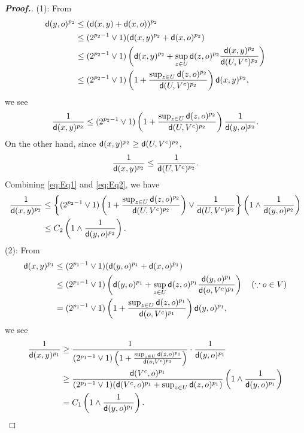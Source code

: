 \documentclass[12pt,a4paper]{article}
\newcommand{\1}{{\bf 1}}
\begin{document}
\begin{proof}[{\bf Proof.}]
(1): From
\begin{align*}
{\sf d}(y,o)^{p_2}&\leq({\sf d}(x,y)+{\sf d}(x,o))^{p_2}\\
&\leq(2^{p_2-1}\lor1)({\sf d}(x,y)^{p_2}+{\sf d}(x,o)^{p_2})\\
&\leq (2^{p_2-1}\lor1)\left({\sf d}(x,y)^{p_2}+\sup_{z\in U}{\sf d}(z,o)^{p_2}\frac{{\sf d}(x,y)^{p_2}}{{\sf d}(U,V^c)^{p_2}} \right)\\
&\leq (2^{p_2-1}\lor1)\left(1+\frac{\sup_{z\in U}{\sf d}(z,o)^{p_2}}{{\sf d}(U,V^c)^{p_2}} \right){\sf d}(x,y)^{p_2},
\end{align*}
we see 
\begin{align}
\frac{1}{{\sf d}(x,y)^{p_2}}\leq (2^{p_2-1}\lor1)\left(1+\frac{\sup_{z\in U}{\sf d}(z,o)^{p_2}}{{\sf d}(U,V^c)^{p_2}} \right)\frac{1}{{\sf d}(y,o)^{p_2}}.\label{eq:Eq1}
\end{align} 
On the other hand, since ${\sf d}(x,y)^{p_2}\geq{\sf d}(U,V^c)^{p_2}$, 
\begin{align}
\frac{1}{{\sf d}(x,y)^{p_2}}\leq\frac{1}{{\sf d}(U,V^c)^{p_2}}.\label{eq:Eq2}
\end{align}
Combining \eqref{eq:Eq1} and \eqref{eq:Eq2}, we have
\begin{align*}
\frac{1}{{\sf d}(x,y)^{p_2}}&\leq\left\{(2^{p_2-1}\lor1)\left(1+\frac{\sup_{z\in U}{\sf d}(z,o)^{p_2}}{{\sf d}(U,V^c)^{p_2}} \right)\lor \frac{1}{{\sf d}(U,V^c)^{p_2}}
 \right\}\left(1\land\frac{1}{{\sf d}(y,o)^{p_2}} \right)\\
 &\leq C_2\left(1\land\frac{1}{{\sf d}(y,o)^{p_2}} \right).
\end{align*} 
(2): From 
\begin{align*}
{\sf d}(x,y)^{p_1}&\leq (2^{p_1-1}\lor1)({\sf d}(y,o)^{p_1}+{\sf d}(x,o)^{p_1})\\
&\leq (2^{p_1-1}\lor1)\left({\sf d}(y,o)^{p_1}+\sup_{z\in U}{\sf d}(z,o)^{p_1}\frac{{\sf d}(y,o)^{p_1}}{
{\sf d}(o,V^c)^{p_1}} \right)\quad (\because o\in V)\\&=(2^{p_1-1}\lor1)\left(1+\frac{\sup_{z\in U}{\sf d}(z,o)^{p_1}}{{\sf d}(o,V^c)^{p_1}} \right){\sf d}(y,o)^{p_1},
\end{align*}
we see 
\begin{align*}
\frac{1}{{\sf d}(x,y)^{p_1}}&\geq \frac{1}{(2^{p_1-1}\lor1)\left(1+\frac{\sup_{z\in U}{\sf d}(z,o)^{p_1}}{{\sf d}(o,V^c)^{p_1}}  \right)}\cdot\frac{1}{{\sf d}(y,o)^{p_1}}\\
&\geq \frac{{\sf d}(V^c,o)^{p_1}}{(2^{p_1-1}\lor1)
({\sf d}(V^c,o)^{p_1}+\sup_{z\in U}{\sf d}(z,o)^{p_1})
}\left(1\land\frac{1}{{\sf d}(y,o)^{p_1}} \right)\\
&=C_1\left(1\land\frac{1}{{\sf d}(y,o)^{p_1}} \right).
\end{align*}
\end{proof}
\end{document}
